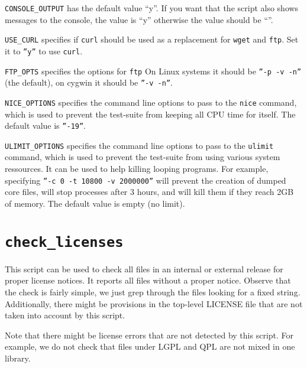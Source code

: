 {\tt CONSOLE\_OUTPUT} has the default value ``y''. If you want that the script
 also shows messages to the console, the value is ``y'' otherwise the value
should be ``''.

{\tt USE\_CURL} specifies if {\tt curl} should be used as a replacement for
{\tt wget} and {\tt ftp}.  Set it to {\tt ''y''} to use {\tt curl}.

{\tt FTP\_OPTS} specifies the options for {\tt ftp}   On Linux systems 
it should be {\tt ''-p -v -n''} (the default), on cygwin it should be {\tt ''-v -n''}.

{\tt NICE\_OPTIONS} specifies the command line options to pass to the
{\tt nice} command, which is used to prevent the test-suite from keeping
all CPU time for itself.  The default value is {\tt ''-19''}.

{\tt ULIMIT\_OPTIONS} specifies the command line options to pass to the
{\tt ulimit} command, which is used to prevent the test-suite from using
various system ressources.  It can be used to help killing looping programs.
For example, specifying {\tt ''-c 0 -t 10800 -v 2000000''} will prevent
the creation of dumped core files, will stop processes after 3 hours,
and will kill them if they reach 2GB of memory.
The default value is empty (no limit).


\section{{\tt check\_licenses}}
\label{sec:check_licenses}

This script can be used to check all files in an internal or external release
for proper license notices. It reports all files without a proper notice.
Observe that the check is fairly simple, we just grep through the files
looking for a fixed string. Additionally, there might be provisions in the
top-level LICENSE file that are not taken into account by this script.

Note that there might be license errors that are not detected by this script.
For example, we do not check that files under LGPL and QPL are not mixed in
one library.

